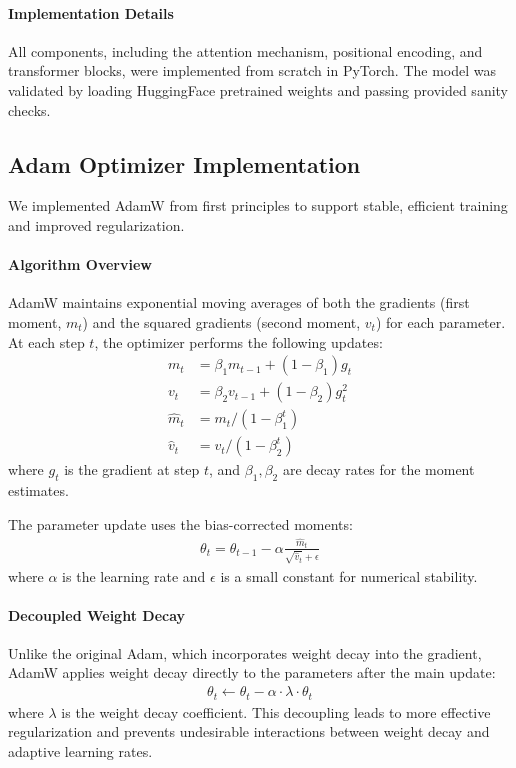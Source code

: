 \documentclass{article}
\begin{document}
\paragraph{Implementation Details}
All components, including the attention mechanism, positional encoding, and transformer blocks, were implemented from scratch in PyTorch. The model was validated by loading HuggingFace pretrained weights and passing provided sanity checks.

\subsection{Adam Optimizer Implementation}
We implemented AdamW from first principles to support stable, efficient training and improved regularization.

\paragraph{Algorithm Overview}
AdamW maintains exponential moving averages of both the gradients (first moment, $m_t$) and the squared gradients (second moment, $v_t$) for each parameter. At each step $t$, the optimizer performs the following updates:
\begin{align*}
    m_t &= \beta_1 m_{t-1} + (1 - \beta_1) g_t \\
    v_t &= \beta_2 v_{t-1} + (1 - \beta_2) g_t^2 \\
    \hat{m}_t &= m_t / (1 - \beta_1^t) \\
    \hat{v}_t &= v_t / (1 - \beta_2^t)
\end{align*}
where $g_t$ is the gradient at step $t$, and $\beta_1, \beta_2$ are decay rates for the moment estimates.

The parameter update uses the bias-corrected moments:
\begin{align*}
    \theta_t = \theta_{t-1} - \alpha \frac{\hat{m}_t}{\sqrt{\hat{v}_t} + \epsilon}
\end{align*}
where $\alpha$ is the learning rate and $\epsilon$ is a small constant for numerical stability.

\paragraph{Decoupled Weight Decay}
Unlike the original Adam, which incorporates weight decay into the gradient, AdamW applies weight decay directly to the parameters after the main update:
\begin{align*}
    \theta_t \leftarrow \theta_t - \alpha \cdot \lambda \cdot \theta_t
\end{align*}
where $\lambda$ is the weight decay coefficient. This decoupling leads to more effective regularization and prevents undesirable interactions between weight decay and adaptive learning rates.
\end{document}
